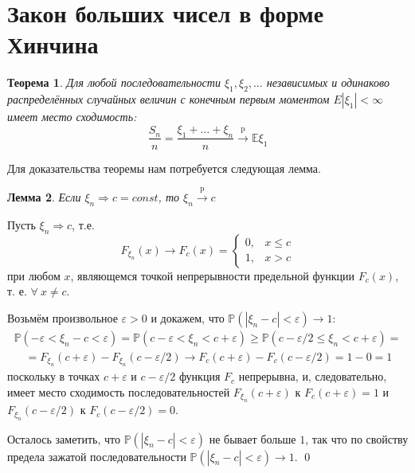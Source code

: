 \documentclass[oneside,final,14pt]{extreport}
\renewenvironment{proof}{{\bfseries Доказательство.}}{\qed}
\newtheorem{thm}{Теорема}[section]
\newtheorem{lem}[thm]{Лемма}
\theoremstyle{definition}
\begin{document}
\section{Закон больших чисел в форме Хинчина}
\begin{thm}
    Для любой последовательности $\xi_{1}, \xi_{2}, \ldots$ независимых и одинаково распределённых случайных величин с конечным первым моментом $E\left|\xi_{1}\right|<\infty$ имеет место сходимость:
    \begin{equation*}
        \frac{S_{n}}{n} = \frac{\xi_{1}+\ldots+\xi_{n}}{n} \xrightarrow[]{\text{p}} \mathbb{E} \xi_{1}
    \end{equation*}
\end{thm}
Для доказательства теоремы нам потребуется следующая лемма.
\begin{lem}
    Если $\xi_{n} \Rightarrow c=const$, то $\xi_{n} \stackrel{\mathrm{p}}{\longrightarrow} c$
\end{lem}
\begin{proof}
    Пусть $\xi_{n} \Rightarrow c$, т.е.
    \begin{equation*}
        F_{\xi_{n}}(x) \rightarrow F_{c}(x)=\left\{\begin{array}{ll}
        0, & x \leqslant c \\
        1, & x>c
        \end{array}\right.
    \end{equation*}
    при любом $x$, являющемся точкой непрерывности предельной функции $F_{c}(x)$, т. е. $\forall~ x \neq c$.
    
    Возьмём произвольное $\varepsilon>0$ и докажем, что $\mathbb{P}\left(\left|\xi_{n}-c\right|<\varepsilon\right) \rightarrow 1$:
    \begin{multline*}
        \mathbb{P}\left(-\varepsilon<\xi_{n}-c<\varepsilon\right)=\mathbb{P}\left(c-\varepsilon<\xi_{n}<c+\varepsilon\right) \geqslant \mathbb{P}\left(c-\varepsilon / 2 \leqslant \xi_{n}<c+\varepsilon\right)= \\
        \quad=F_{\xi_{n}}(c+\varepsilon)-F_{\xi_{n}}(c-\varepsilon / 2) \rightarrow F_{c}(c+\varepsilon)-F_{c}(c-\varepsilon / 2)=1-0=1
    \end{multline*}
    поскольку в точках $c+\varepsilon$ и $c-\varepsilon / 2$ функция $F_{c}$ непрерывна, и, следовательно, имеет место сходимость последовательностей $F_{\xi_{n}}(c+\varepsilon)$ к $F_{c}(c+\varepsilon)=1$ и $F_{\xi_{n}}(c-\varepsilon / 2)$ к $F_{c}(c-\varepsilon / 2)=0$.
    
    Осталось заметить, что $\mathbb{P}\left(\left|\xi_{n}-c\right|<\varepsilon\right)$ не бывает больше $1$, так что по свойству предела зажатой последовательности $\mathbb{P}\left(\left|\xi_{n}-c\right|<\varepsilon\right) \rightarrow 1$.
\end{proof}
\end{document}
